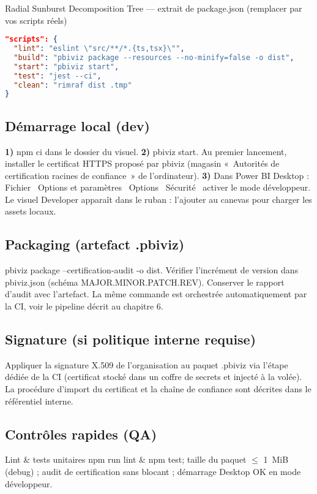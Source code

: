 Radial Sunburst Decomposition Tree — extrait de package.json (remplacer par vos scripts réels)
\begin{lstlisting}[language=json,basicstyle=\ttfamily\small,breaklines=true,columns=fullflexible]
"scripts": {
  "lint": "eslint \"src/**/*.{ts,tsx}\"",
  "build": "pbiviz package --resources --no-minify=false -o dist",
  "start": "pbiviz start",
  "test": "jest --ci",
  "clean": "rimraf dist .tmp"
}
\end{lstlisting}

\subsection{Démarrage local (dev)}
\textbf{1)} npm ci dans le dossier du visuel. \textbf{2)} pbiviz start. Au premier lancement, installer le certificat HTTPS proposé par pbiviz (magasin «~Autorités de certification racines de confiance~» de l’ordinateur). \textbf{3)} Dans Power BI Desktop : Fichier \textrightarrow\ Options et paramètres \textrightarrow\ Options \textrightarrow\ Sécurité \textrightarrow\ activer le mode développeur. Le visuel Developer apparaît dans le ruban : l’ajouter au canevas pour charger les assets locaux.

\subsection{Packaging (artefact .pbiviz)}
pbiviz package --certification-audit -o dist. Vérifier l’incrément de version dans pbiviz.json (schéma MAJOR.MINOR.PATCH.REV). Conserver le rapport d’audit avec l’artefact. La même commande est orchestrée automatiquement par la CI, voir le pipeline décrit au chapitre 6. 

\subsection{Signature (si politique interne requise)}
Appliquer la signature X.509 de l’organisation au paquet .pbiviz via l’étape dédiée de la CI (certificat stocké dans un coffre de secrets et injecté à la volée). La procédure d’import du certificat et la chaîne de confiance sont décrites dans le référentiel interne.

\subsection{Contrôles rapides (QA)}
Lint \& tests unitaires npm run lint \& npm test; taille du paquet \(\leq\) 1~MiB (debug) ; audit de certification sans blocant ; démarrage Desktop OK en mode développeur.
